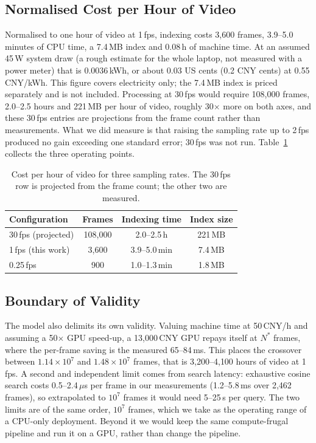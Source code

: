 \documentclass[journal]{IEEEtran}
\begin{document}
\subsection{Normalised Cost per Hour of Video}
Normalised to one hour of video at 1\,fps, indexing costs 3{,}600 frames, 3.9--5.0 minutes of
CPU time, a 7.4\,MB index and 0.08\,h of machine time. At an assumed 45\,W system draw (a rough
estimate for the whole laptop, not measured with a power meter) that is 0.0036\,kWh, or about
0.03 US cents (0.2 CNY cents) at 0.55\,CNY/kWh. This figure covers electricity only; the
7.4\,MB index is priced separately and is not included. Processing at 30\,fps would require
108{,}000 frames, 2.0--2.5 hours and 221\,MB per hour of video, roughly 30$\times$ more on both
axes, and these 30\,fps entries are projections from the frame count rather than measurements.
What we did measure is that raising the sampling rate up to 2\,fps produced no gain exceeding
one standard error; 30\,fps was not run. Table~\ref{tab:perhour} collects the three operating
points.

\begin{table}[t]
\centering
\caption{Cost per hour of video for three sampling rates. The 30\,fps row is projected from the
frame count; the other two are measured.}
\label{tab:perhour}
\begin{tabular*}{\columnwidth}{@{\extracolsep{\fill}}lccc@{}}
\toprule
Configuration & Frames & Indexing time & Index size \\
\midrule
30\,fps (projected)      & 108{,}000 & 2.0--2.5\,h  & 221\,MB \\
1\,fps (this work)       & 3{,}600   & 3.9--5.0\,min & 7.4\,MB \\
0.25\,fps                & 900       & 1.0--1.3\,min & 1.8\,MB \\
\bottomrule
\end{tabular*}
\end{table}

\subsection{Boundary of Validity}
The model also delimits its own validity. Valuing machine time at 50\,CNY/h and assuming a
50$\times$ GPU speed-up, a 13{,}000\,CNY GPU repays itself at $N^{*}$ frames, where the
per-frame saving is the measured 65--84\,ms. This places the crossover between
$1.14\times10^{7}$ and $1.48\times10^{7}$ frames, that is 3{,}200--4{,}100 hours of video at
1\,fps. A second and independent limit comes from search latency: exhaustive cosine search costs
0.5--2.4\,$\mu$s per frame in our measurements (1.2--5.8\,ms over 2{,}462 frames), so
extrapolated to $10^{7}$ frames it would need 5--25\,s per query. The two limits are of the same
order, $10^{7}$ frames, which we take as the operating range of a CPU-only deployment. Beyond it
we would keep the same compute-frugal pipeline and run it on a GPU, rather than change the
pipeline.
\end{document}
